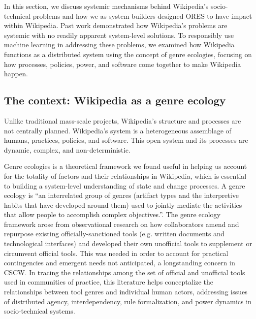 In this section, we discuss systemic mechanisms behind Wikipedia's socio-technical problems and how we as system builders designed ORES to have impact within Wikipedia.  Past work demonstrated how Wikipedia's problems are systemic with no readily apparent system-level solutions. To responsibly use machine learning in addressing these problems, we examined how Wikipedia functions as a distributed system using the concept of genre ecologies, focusing on how processes, policies, power, and software come together to make Wikipedia happen.

\subsection{The context: Wikipedia as a genre ecology}
Unlike traditional mass-scale projects, Wikipedia's structure and processes are not centrally planned. Wikipedia's system is a heterogeneous assemblage of humans, practices, policies, and software.  This open system and its processes are dynamic, complex, and non-deterministic.

Genre ecologies is a theoretical framework we found useful in helping us account for the totality of factors and their relationships in Wikipedia, which is essential to building a system-level understanding of state and change processes.  A genre ecology is ``an interrelated group of genres (artifact types and the interpretive habits that have developed around them) used to jointly mediate the activities that allow people to accomplish complex objectives.''\cite{spinuzzi2000genre}. The genre ecology framework arose from observational research on how collaborators amend and repurpose existing officially-sanctioned tools (e.g. written documents and technological interfaces) and developed their own unofficial tools to supplement or circumvent official tools. This was needed in order to account for practical contingencies and emergent needs not anticipated, a longstanding concern in CSCW. In tracing the relationships among the set of official and unofficial tools used in communities of practice, this literature helps conceptalize the relationships between tool genres and individual human actors, addressing issues of distributed agency, interdependency, rule formalization, and power dynamics in socio-technical systems\cite{spinuzzi2003tracing}.

